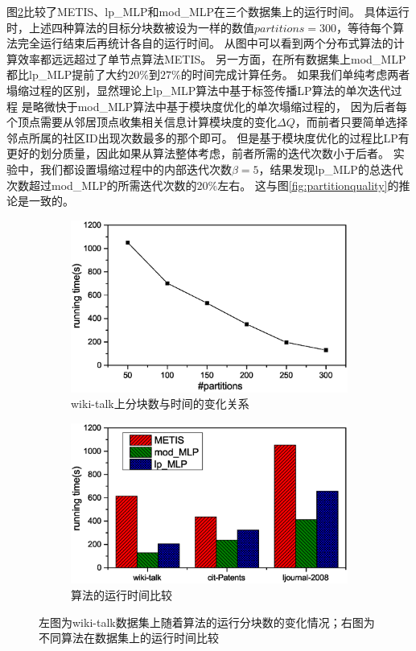 \documentclass[master]{njuthesis}
\begin{document}
图\ref{fig:partition_time}比较了METIS、lp\string_MLP和mod\string_MLP在三个数据集上的运行时间。
具体运行时，上述四种算法的目标分块数被设为一样的数值$partitions=300$，等待每个算法完全运行结束后再统计各自的运行时间。
从图中可以看到两个分布式算法的计算效率都远远超过了单节点算法METIS。
另一方面，在所有数据集上mod\string_MLP都比lp\string_MLP提前了大约$20\%$到$27\%$的时间完成计算任务。
如果我们单纯考虑两者塌缩过程的区别，显然理论上lp\string_MLP算法中基于标签传播LP算法的单次迭代过程
是略微快于mod\string_MLP算法中基于模块度优化的单次塌缩过程的，
因为后者每个顶点需要从邻居顶点收集相关信息计算模块度的变化$\Delta Q$，而前者只要简单选择邻点所属的社区ID出现次数最多的那个即可。
但是基于模块度优化的过程比LP有更好的划分质量，因此如果从算法整体考虑，前者所需的迭代次数小于后者。
实验中，我们都设置塌缩过程中的内部迭代次数$\beta=5$，结果发现lp\string_MLP的总迭代次数超过mod\string_MLP的所需迭代次数的$20\%$左右。
这与图\ref{fig:partitionquality}的推论是一致的。

\begin{figure}[t]
\centering
\begin{subfigure}[b]{0.48\textwidth}
	\center
	\includegraphics[width=1\textwidth]{figure/block_time.eps}
	\caption{wiki-talk上分块数与时间的变化关系}
	\label{fig:block_with_time}
\end{subfigure}
\begin{subfigure}[b]{0.48\textwidth}
	\centering
	\includegraphics[width=1\textwidth]{figure/running_ti.eps}
	\caption{算法的运行时间比较}
	\label{fig:partition_time}
\end{subfigure}
\label{fig:running_cond}
\caption{左图为wiki-talk数据集上随着算法的运行分块数的变化情况；右图为不同算法在数据集上的运行时间比较}
\end{figure}
\end{document}
